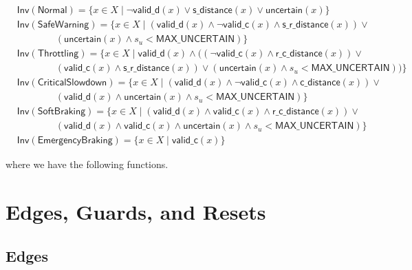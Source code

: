 \documentclass[12pt]{article}
\theoremstyle{definition}
\begin{document}
\[
\begin{aligned}
&\mathsf{Inv}(\mathsf{Normal}) = \{ x \in X \mid \neg \mathsf{valid\_d}(x) \lor \mathsf{s\_distance}(x) \lor \mathsf{uncertain}(x) \} \\
&\mathsf{Inv}(\mathsf{SafeWarning}) = \{ x \in X \mid (\mathsf{valid\_d}(x) \land \neg \mathsf{valid\_c}(x) \land \mathsf{s\_r\_distance}(x)) \lor  \\ 
&\qquad\qquad(\mathsf{uncertain}(x) \land s_u < \mathsf{MAX\_UNCERTAIN})\} \\
&\mathsf{Inv}(\mathsf{Throttling}) = \{ x \in X \mid \mathsf{valid\_d}(x) \land \big( (\neg \mathsf{valid\_c}(x) \land \mathsf{r\_c\_distance}(x)) \lor \\ 
&\qquad\qquad(\mathsf{valid\_c}(x) \land \mathsf{s\_r\_distance}(x)) \lor (\mathsf{uncertain}(x) \land s_u < \mathsf{MAX\_UNCERTAIN})\big) \} \\
&\mathsf{Inv}(\mathsf{CriticalSlowdown}) = \{ x \in X \mid (\mathsf{valid\_d}(x) \land \neg \mathsf{valid\_c}(x) \land \mathsf{c\_distance}(x)) \lor \\
&\qquad\qquad(\mathsf{valid\_d}(x) \land \mathsf{uncertain}(x) \land s_u < \mathsf{MAX\_UNCERTAIN})\} \\
&\mathsf{Inv}(\mathsf{SoftBraking}) = \{ x \in X \mid (\mathsf{valid\_d}(x) \land \mathsf{valid\_c}(x) \land \mathsf{r\_c\_distance}(x)) \lor \\ 
&\qquad\qquad (\mathsf{valid\_d}(x) \land \mathsf{valid\_c}(x) \land \mathsf{uncertain}(x) \land s_u < \mathsf{MAX\_UNCERTAIN})\}\\
&\mathsf{Inv}(\mathsf{EmergencyBraking}) = \{ x \in X \mid \mathsf{valid\_c}(x) \}
\end{aligned}
\]

where we have the following functions.


\section{Edges, Guards, and Resets}

\subsection{Edges}
\end{document}
